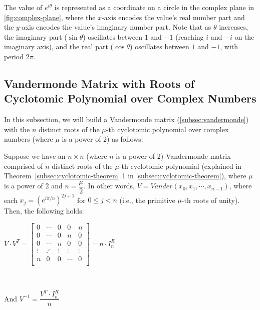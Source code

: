 The value of $e^{i\theta}$ is represented as a coordinate on a circle in the complex plane in \autoref{fig:complex-plane}, where the $x$-axis encodes the value's real number part and the $y$-axis encodes the value's imaginary number part. Note that as $\theta$ increases, the imaginary part ($\sin\theta$) oscillates between $1$ and $-1$ (reaching $i$ and $-i$ on the imaginary axis), and the real part ($\cos\theta$) oscillates between $1$ and $-1$, with period $2\pi$.


\subsection{Vandermonde Matrix with Roots of Cyclotomic Polynomial over Complex Numbers}
\label{subsec:vandermonde-euler}

 
 
In this subsection, we will build a Vandermonde matrix (\autoref{subsec:vandermonde}) with the $n$ distinct roots of the $\mu$-th cyclotomic polynomial over complex numbers (where $\mu$ is a power of 2) as follows:



\begin{tcolorbox}[title={\textbf{\tboxtheorem{\ref*{subsec:vandermonde-euler}} Vandermonde Matrix with the Roots of  \text{(power-of-2)}-th Cyclotomic Polynomial over Complex Numbers}}]

Suppose we have an $n \times n$ (where $n$ is a power of 2) Vandermonde matrix comprised of $n$ distinct roots of the $\mu$-th cyclotomic polynomial (explained in Theorem~\ref*{subsec:cyclotomic-theorem}.1 in \autoref{subsec:cyclotomic-theorem}), where $\mu$ is a power of 2 and $n = \dfrac{\mu}{2}$. In other words, $V = \mathit{Vander}(x_0, x_1, \cdots, x_{n-1})$, where each $x_j = (e^{i\pi/n})^{2j+1}$ for $0 \leq j<n$ (i.e., the primitive $\mu$-th roots of unity). Then, the following holds:

$V \cdot V^T = \begin{bmatrix}
0 & \cdots & 0 & 0 & n\\
0 & \cdots & 0 & n & 0\\
0 & \cdots & n & 0 & 0\\
\vdots & \iddots & \vdots & \vdots & \vdots \\
n & 0 & 0 & \cdots & 0\\
\end{bmatrix} = n \cdot I^R_n$

$ $

And $V^{-1} = \dfrac{V^T \cdot I_n^R}{n}$


\end{tcolorbox}

